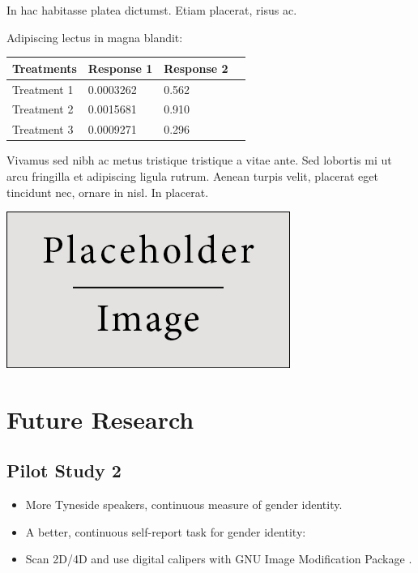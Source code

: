 \documentclass[a0,portrait]{a0poster}
\begin{document}
\begin{multicols}{2}
In hac habitasse platea dictumst. Etiam placerat, risus ac.

Adipiscing lectus in magna blandit:

\begin{center}\vspace{1cm}
\begin{tabular}{l l l l}
\toprule
\textbf{Treatments} & \textbf{Response 1} & \textbf{Response 2} \\
\midrule
Treatment 1 & 0.0003262 & 0.562 \\
Treatment 2 & 0.0015681 & 0.910 \\
Treatment 3 & 0.0009271 & 0.296 \\
\bottomrule
\end{tabular}
\end{center}\vspace{1cm}

Vivamus sed nibh ac metus tristique tristique a vitae ante. Sed lobortis mi ut arcu fringilla et adipiscing ligula rutrum. Aenean turpis velit, placerat eget tincidunt nec, ornare in nisl. In placerat.

\begin{center}\vspace{1cm}
\includegraphics[width=0.8\linewidth]{placeholder}
\end{center}\vspace{1cm}

\section*{Future Research}

\subsection{Pilot Study 2}
\begin{itemize}
\item More Tyneside speakers, continuous measure of gender identity.
\item A better, continuous self-report task for gender identity:
\end{itemize}
\begin{itemize}
\item Scan 2D/4D and use digital calipers with GNU Image Modification Package \citep[][]{allawayetal2009}.
\end{itemize}


\end{multicols}
\end{document}
